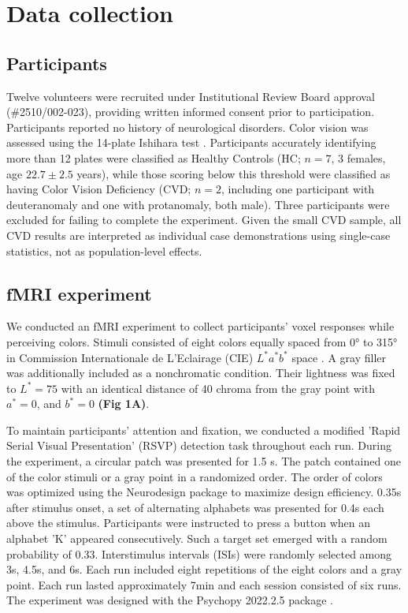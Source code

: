 
\section{Data collection}

\subsection*{Participants}

Twelve volunteers were recruited under Institutional Review Board approval (\#2510/002-023), providing written informed consent prior to participation. Participants reported no history of neurological disorders. Color vision was assessed using the 14-plate Ishihara test \cite{ishihara1917}. Participants accurately identifying more than 12 plates were classified as Healthy Controls (HC; $n=7$, 3 females, age $22.7 \pm 2.5$ years), while those scoring below this threshold were classified as having Color Vision Deficiency (CVD; $n=2$, including one participant with deuteranomaly and one with protanomaly, both male). Three participants were excluded for failing to complete the experiment. Given the small CVD sample, all CVD results are interpreted as individual case demonstrations using \textcite{crawford1998} single-case statistics, not as population-level effects.

\subsection*{fMRI experiment}

We conducted an fMRI experiment to collect participants' voxel responses while perceiving colors. Stimuli consisted of eight colors equally spaced from 0° to 315° in Commission Internationale de L'Eclairage (CIE) $L^*a^*b^*$ space \cite{cie1986}. A gray filler was additionally included as a nonchromatic condition. Their lightness was fixed to $L^* = 75$ with an identical distance of 40 chroma from the gray point with $a^* = 0$, and $b^* = 0$ \textbf{(Fig 1A)}.

To maintain participants' attention and fixation, we conducted a modified 'Rapid Serial Visual Presentation' (RSVP) detection task \cite{brouwer2009} throughout each run. During the experiment, a circular patch was presented for 1.5 s. The patch contained one of the color stimuli or a gray point in a randomized order. The order of colors was optimized using the Neurodesign package \cite{durnez2018} to maximize design efficiency. 0.35s after stimulus onset, a set of alternating alphabets was presented for 0.4s each above the stimulus. Participants were instructed to press a button when an alphabet 'K' appeared consecutively. Such a target set emerged with a random probability of 0.33. Interstimulus intervals (ISIs) were randomly selected among 3s, 4.5s, and 6s. Each run included eight repetitions of the eight colors and a gray point. Each run lasted approximately 7min and each session consisted of six runs. The experiment was designed with the Psychopy 2022.2.5 package \cite{peirce2019}.

